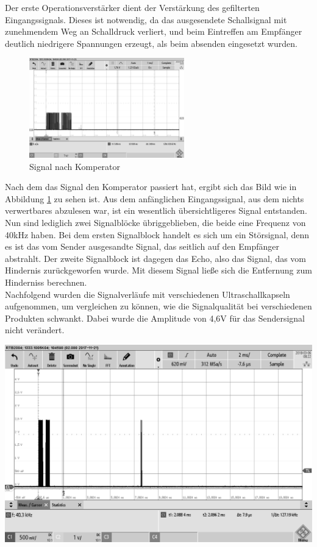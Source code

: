 Der erste Operationsverstärker dient der Verstärkung des gefilterten Eingangssignals. Dieses ist notwendig, da das ausgesendete Schallsignal mit zunehmendem Weg an Schalldruck verliert, und beim Eintreffen am Empfänger deutlich niedrigere Spannungen erzeugt, als beim absenden eingesetzt wurden. 
\begin{figure}[H]
\includegraphics[width=0.6\textwidth, draft]{Abbildungen/Signal-nach-Komperator.png}\caption{Signal nach Komperator}\label{fig:Komperator}
\end{figure}
Nach dem das Signal den Komperator passiert hat, ergibt sich das Bild wie in Abbildung \ref{fig:Komperator} zu sehen ist. Aus dem anfänglichen Eingangssignal, aus dem nichts verwertbares abzulesen war, ist ein wesentlich übersichtligeres Signal entstanden. Nun sind lediglich zwei Signalblöcke übriggeblieben, die beide eine Frequenz von 40kHz haben. Bei dem ersten Signalblock handelt es sich um ein Störsignal, denn es ist das vom Sender ausgesandte Signal, das seitlich auf den Empfänger abstrahlt. Der zweite Signalblock ist dagegen das Echo, also das Signal, das vom Hindernis zurückgeworfen wurde. Mit diesem Signal ließe sich die Entfernung zum Hinderniss berechnen.\\
Nachfolgend wurden die Signalverläufe mit verschiedenen Ultraschallkapseln aufgenommen, um vergleichen zu können, wie die Signalqualität bei verschiedenen Produkten schwankt. Dabei wurde die Amplitude von 4,6V für das Sendersignal nicht verändert.\\
\begin{minipage}{0.5\textwidth}
\includegraphics[width=1\textwidth, draft]{Abbildungen/Messungen4,6V/EKULIT1,5m.png}
\label{fig:EKULIT1,5m}
\end{minipage}

